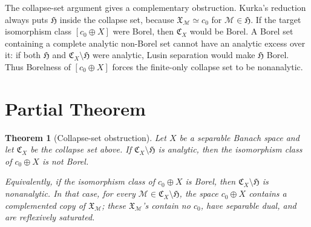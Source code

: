\documentclass[11pt]{article}
\newtheorem*{theorem}{Theorem}
\begin{document}
The collapse-set argument gives a complementary obstruction.  Kurka's reduction
always puts \(\mathfrak H\) inside the collapse set, because
\(\mathfrak X_{\mathcal M}\simeq c_0\) for \(\mathcal M\in\mathfrak H\).  If
the target isomorphism class \([c_0\oplus X]\) were Borel, then
\(\mathfrak C_X\) would be Borel.  A Borel set containing a complete analytic
non-Borel set cannot have an analytic excess over it: if both \(\mathfrak H\)
and \(\mathfrak C_X\setminus \mathfrak H\) were analytic, Lusin separation would
make \(\mathfrak H\) Borel.  Thus Borelness of \([c_0\oplus X]\) forces the
finite-only collapse set to be nonanalytic.

\section*{Partial Theorem}

\begin{theorem}[Collapse-set obstruction]
Let \(X\) be a separable Banach space and let \(\mathfrak C_X\) be the collapse set above.  If \(\mathfrak C_X\setminus\mathfrak H\) is analytic, then the isomorphism class of \(c_0\oplus X\) is not Borel.

Equivalently, if the isomorphism class of \(c_0\oplus X\) is Borel, then \(\mathfrak C_X\setminus\mathfrak H\) is nonanalytic.  In that case, for every \(\mathcal M\in \mathfrak C_X\setminus\mathfrak H\), the space \(c_0\oplus X\) contains a complemented copy of \(\mathfrak X_{\mathcal M}\); these \(\mathfrak X_{\mathcal M}\)'s contain no \(c_0\), have separable dual, and are reflexively saturated.
\end{theorem}
\end{document}
